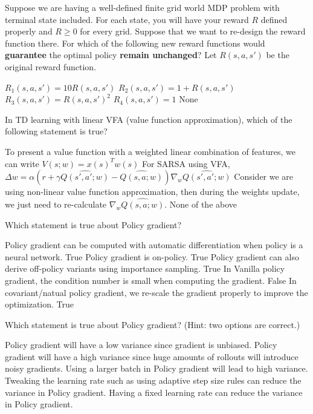 \documentclass[letterpaper,12pt,addpoints]{exam}
\begin{document}
\begin{questions}
\question[2] Suppose we are having a well-defined finite grid world MDP problem with terminal state included. For each state, you will have your reward $R$ defined properly and $R\ge 0$ for every grid. Suppose that we want to re-design the reward function there. For which of the following new reward functions would \textbf{guarantee} the optimal policy \textbf{remain unchanged}? Let $R(s,a,s')$ be the original reward function. 

\begin{checkboxes}
 \choice $R_1(s,a,s') = 10R(s,a,s')$
 \choice $R_2(s,a,s') = 1+R(s,a,s')$
 \choice $R_3(s,a,s') = R(s,a,s')^2$
 \choice $R_4(s,a,s') = 1$
 \choice None
\end{checkboxes}

\question[2] In TD learning with linear VFA (value function approximation), which of the following statement is true? 
\begin{checkboxes}
\choice To present a value function with a weighted linear combination of features, we can write $V(s; w) = x(s)^Tw(s)$
\choice For SARSA using VFA,  
$\Delta w = \alpha(r+\gamma \hat{Q(s', a'; w)} - \hat{Q(s, a; w)})\nabla_w\hat{Q(s', a'; w)}$
\choice Consider we are using non-linear value function approximation, then during the weights update, we just need to re-calculate $\nabla_w\hat{Q(s, a; w)}$. 
\choice None of the above
\end{checkboxes}


\question[2] Which statement is true about Policy gradient?
\begin{checkboxes}
 \choice Policy gradient can be computed with automatic differentiation when policy is a neural network. True
 \choice Policy gradient is on-policy. True
 \choice Policy gradient can also derive off-policy variants using importance sampling. True
 \choice In Vanilla policy gradient, the condition number is small when computing the gradient. False
 \choice In covariant/natual policy gradient, we re-scale the gradient properly to improve the optimization. True
\end{checkboxes}

\question[2] Which statement is true about Policy gradient? (Hint: two options are correct.)
\begin{checkboxes}
 \choice Policy gradient will have a low variance since gradient is unbiased. 
 \choice Policy gradient will have a high variance since huge amounts of rollouts will introduce noisy gradients.
 \choice Using a larger batch in Policy gradient will lead to high variance.
 \choice Tweaking the learning rate such as using adaptive step size rules can reduce the variance in Policy gradient.
 \choice Having a fixed learning rate can reduce the variance in Policy gradient.
\end{checkboxes}


\end{questions}
\end{document}
